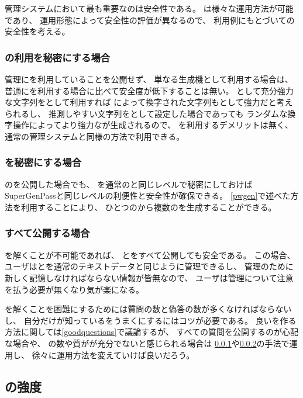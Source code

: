 \documentclass[twoside]{wiss}
\begin{document}
{\PW}管理システムにおいて最も重要なのは安全性である。
%
{\EP}は様々な運用方法が可能であり、
運用形態によって安全性の評価が異なるので、
利用例にもとづいて{\EP}の安全性を考える。

\subsubsection{\protect{\textsf{\EP}}の利用を秘密にする場合}
\label{pattern1}

{\PW}管理に{\EP}を利用していることを公開せず、
単なる{\PW}生成機として利用する場合は、
普通に{\PW}を利用する場合に比べて安全度が低下することは無い。
{\PW}として充分強力な文字列を{\SS}として利用すれば
{\EP}によって換字された文字列も{\PW}として強力だと考えられるし、
推測しやすい文字列を{\SS}として設定した場合であっても
ランダムな換字操作によってより強力な{\PW}が生成されるので、
{\EP}を利用するデメリットは無く、
通常の{\PW}管理システムと同様の方法で利用できる。

\subsubsection{{\SS}を秘密にする場合}
\label{pattern2}

{\EP}の{\SQ}を公開した場合でも、
{\SS}を通常の{\PW}と同じレベルで秘密にしておけば
SuperGenPass\cite{SuperGenPass}と同じレベルの利便性と安全性が確保できる。
\ref{pwgen}で述べた方法を利用することにより、
ひとつの{\SS}から複数の{\PW}を生成することができる。

\subsubsection{すべて公開する場合}

{\SQ}を解くことが不可能であれば、
{\SS}と{\SQ}をすべて公開しても安全である。
この場合、
ユーザは{\SQ}と{\SS}を通常のテキストデータと同じように管理できるし、
{\PW}管理のために新しく記憶しなければならない情報が皆無なので、
ユーザは{\PW}管理について注意を払う必要が無くなり気が楽になる。

{\SQ}を解くことを困難にするためには質問の数と偽答の数が多くなければならないし、
自分だけが知っている{\EM}をうまく{\SQ}にするにはコツが必要である。
良い{\SQ}を作る方法に関しては\ref{goodquestions}で議論するが、
すべての質問を公開するのが心配な場合や、
{\SQ}の数や質がが充分でないと感じられる場合は
\ref{pattern1}や\ref{pattern2}の手法で運用し、
徐々に運用方法を変えていけば良いだろう。

\subsection{{\SQ}の強度}
\end{document}
